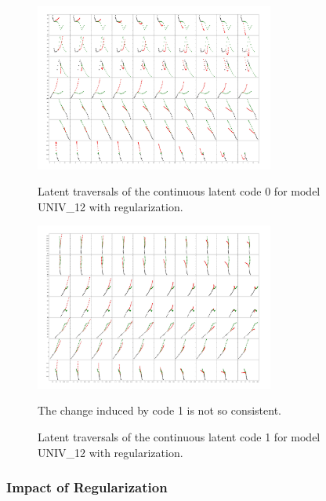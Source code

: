 \begin{figure}[t]
  \centering
  \includegraphics[width=0.7\textwidth]{figures/cont_interpolations_code0_batch2.jpeg}
  \caption{Latent traversals of the continuous latent code 0 for model UNIV\_12 with regularization. }
  \label{cont_code_0}

  \includegraphics[width=0.7\textwidth]{figures/reg_cont_interpolations_code1_batch1.jpeg}
  \caption{Latent traversals of the continuous latent code 1 for model UNIV\_12 with regularization. }
  {The change induced by code 1 is not so consistent. }
  \label{cont_code_1}
\end{figure}

\subsubsection{Impact of Regularization}
\hfill \\

